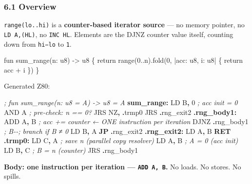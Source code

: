 \documentclass[
  11pt,
]{article}
\newenvironment{Shaded}{\begin{snugshade}}{\end{snugshade}}
\newcommand{\BuiltInTok}[1]{#1}
\newcommand{\CommentTok}[1]{\textcolor[rgb]{0.56,0.35,0.01}{\textit{#1}}}
\newcommand{\ControlFlowTok}[1]{\textcolor[rgb]{0.13,0.29,0.53}{\textbf{#1}}}
\newcommand{\DecValTok}[1]{\textcolor[rgb]{0.00,0.00,0.81}{#1}}
\newcommand{\FunctionTok}[1]{\textcolor[rgb]{0.13,0.29,0.53}{\textbf{#1}}}
\newcommand{\NormalTok}[1]{#1}
\newcommand{\OperatorTok}[1]{\textcolor[rgb]{0.81,0.36,0.00}{\textbf{#1}}}
\begin{document}
\hypertarget{overview}{%
\subsubsection{6.1 Overview}\label{overview}}

\texttt{range(lo..hi)} is a \textbf{counter-based iterator source} ---
no memory pointer, no \texttt{LD\ A,(HL)}, no \texttt{INC\ HL}. Elements
are the DJNZ counter value itself, counting down from \texttt{hi−lo} to
\texttt{1}.

\begin{Shaded}
\begin{Highlighting}[]
\NormalTok{fun sum\_range(n: u8) {-}\textgreater{} u8 \{}
\NormalTok{    return range(0..n).fold(0, |acc: u8, i: u8| \{ return acc + i \})}
\NormalTok{\}}
\end{Highlighting}
\end{Shaded}

Generated Z80:

\begin{Shaded}
\begin{Highlighting}[]
\CommentTok{; fun sum\_range(n: u8 = A) {-}\textgreater{} u8 = A}
\FunctionTok{sum\_range:}
\NormalTok{    LD B}\OperatorTok{,} \DecValTok{0}              \CommentTok{; acc init = 0}
    \BuiltInTok{AND}\NormalTok{ A                }\CommentTok{; pre{-}check: n == 0?}
\NormalTok{    JRS NZ}\OperatorTok{,} \OperatorTok{.}\NormalTok{trmp0}
\NormalTok{    JRS }\OperatorTok{.}\NormalTok{rng\_exit2}
\FunctionTok{.rng\_body1:}
    \BuiltInTok{ADD}\NormalTok{ A}\OperatorTok{,}\NormalTok{ B             }\CommentTok{; acc += counter  ← ONE instruction per iteration}
\NormalTok{    DJNZ }\OperatorTok{.}\NormalTok{rng\_body1      }\CommentTok{; B{-}{-}; branch if B ≠ 0}
\NormalTok{    LD B}\OperatorTok{,}\NormalTok{ A}
    \ControlFlowTok{JP} \OperatorTok{.}\NormalTok{rng\_exit2}
\FunctionTok{.rng\_exit2:}
\NormalTok{    LD A}\OperatorTok{,}\NormalTok{ B}
    \ControlFlowTok{RET}
\FunctionTok{.trmp0:}
\NormalTok{    LD C}\OperatorTok{,}\NormalTok{ A              }\CommentTok{; save n (parallel copy resolver)}
\NormalTok{    LD A}\OperatorTok{,}\NormalTok{ B              }\CommentTok{; A = 0 (acc init)}
\NormalTok{    LD B}\OperatorTok{,}\NormalTok{ C              }\CommentTok{; B = n (counter)}
\NormalTok{    JRS }\OperatorTok{.}\NormalTok{rng\_body1}
\end{Highlighting}
\end{Shaded}

\textbf{Body: one instruction per iteration --- \texttt{ADD\ A,\ B}.} No
loads. No stores. No spills.
\end{document}
